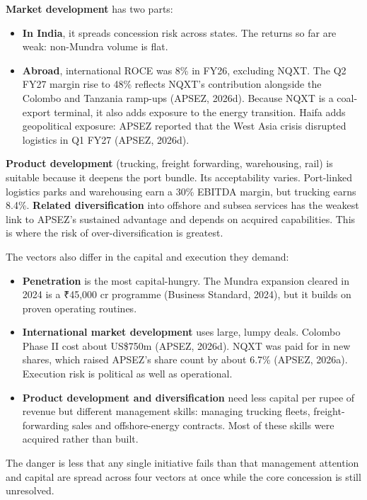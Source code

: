 \documentclass[12pt, a4paper]{article}
\begin{document}
\textbf{Market development} has two parts:
\begin{itemize}
  \item \textbf{In India}, it spreads concession risk across states. The returns
        so far are weak: non-Mundra volume is flat.
  \item \textbf{Abroad}, international ROCE was 8\% in FY26, excluding NQXT. The
        Q2 FY27 margin rise to 48\% reflects NQXT's contribution alongside the
        Colombo and Tanzania ramp-ups (APSEZ, 2026d). Because NQXT is a
        coal-export terminal, it also adds exposure to the energy transition.
        Haifa adds geopolitical exposure: APSEZ reported that the West Asia
        crisis disrupted logistics in Q1 FY27 (APSEZ, 2026d).
\end{itemize}

\textbf{Product development} (trucking, freight forwarding, warehousing, rail)
is suitable because it deepens the port bundle. Its acceptability varies.
Port-linked logistics parks and warehousing earn a 30\% EBITDA margin, but
trucking earns 8.4\%. \textbf{Related diversification} into offshore and subsea
services has the weakest link to APSEZ's sustained advantage and depends on
acquired capabilities. This is where the risk of over-diversification is
greatest.

The vectors also differ in the capital and execution they demand:
\begin{itemize}
  \item \textbf{Penetration} is the most capital-hungry. The Mundra expansion
        cleared in 2024 is a ₹45,000 cr programme (Business Standard, 2024), but
        it builds on proven operating routines.
  \item \textbf{International market development} uses large, lumpy deals.
        Colombo Phase II cost about US\$750m (APSEZ, 2026d). NQXT was paid for in
        new shares, which raised APSEZ's share count by about 6.7\% (APSEZ,
        2026a). Execution risk is political as well as operational.
  \item \textbf{Product development and diversification} need less capital per
        rupee of revenue but different management skills: managing trucking
        fleets, freight-forwarding sales and offshore-energy contracts. Most of
        these skills were acquired rather than built.
\end{itemize}

The danger is less that any single initiative fails than that management
attention and capital are spread across four vectors at once while the core
concession is still unresolved.
\end{document}
